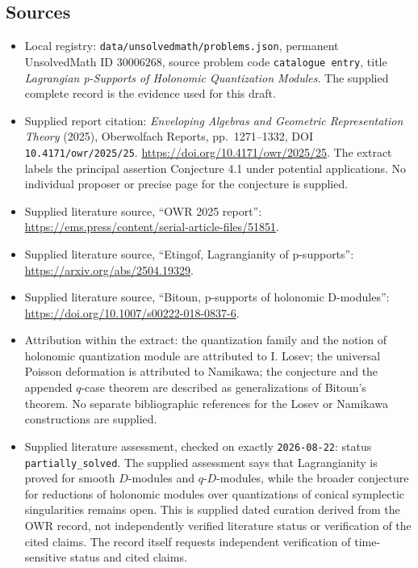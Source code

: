 \documentclass[11pt]{article}
\begin{document}
\subsection{Sources}
\begin{itemize}
\item Local registry: \texttt{data/unsolvedmath/problems.json}, permanent UnsolvedMath ID \(30006268\), source problem code \texttt{catalogue entry}, title \emph{Lagrangian p-Supports of Holonomic Quantization Modules}. The supplied complete record is the evidence used for this draft.
\item Supplied report citation: \emph{Enveloping Algebras and Geometric Representation Theory} (2025), Oberwolfach Reports, pp.\ 1271--1332, DOI \texttt{10.4171/owr/2025/25}. \url{https://doi.org/10.4171/owr/2025/25}. The extract labels the principal assertion Conjecture 4.1 under potential applications. No individual proposer or precise page for the conjecture is supplied.
\item Supplied literature source, ``OWR 2025 report'': \url{https://ems.press/content/serial-article-files/51851}.
\item Supplied literature source, ``Etingof, Lagrangianity of p-supports'': \url{https://arxiv.org/abs/2504.19329}.
\item Supplied literature source, ``Bitoun, p-supports of holonomic D-modules'': \url{https://doi.org/10.1007/s00222-018-0837-6}.
\item Attribution within the extract: the quantization family and the notion of holonomic quantization module are attributed to I. Losev; the universal Poisson deformation is attributed to Namikawa; the conjecture and the appended \(q\)-case theorem are described as generalizations of Bitoun's theorem. No separate bibliographic references for the Losev or Namikawa constructions are supplied.
\item Supplied literature assessment, checked on exactly \texttt{2026-08-22}: status \texttt{partially\_solved}. The supplied assessment says that Lagrangianity is proved for smooth \(D\)-modules and \(q\)-\(D\)-modules, while the broader conjecture for reductions of holonomic modules over quantizations of conical symplectic singularities remains open. This is supplied dated curation derived from the OWR record, not independently verified literature status or verification of the cited claims. The record itself requests independent verification of time-sensitive status and cited claims.
\end{itemize}
\end{document}
